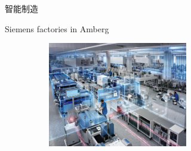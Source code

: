 \begin{frame}{智能制造}
	\begin{exampleblock}{\textrm{Siemens factories in Amberg}}

\begin{figure}[h!]
\centering
     \includegraphics[height=1.8in, width=3.1in, viewport=0 0 2650 1992,clip]{Figures/Siemens_Amberg-Factory.jpeg}
\label{Fig:Siemens_Amberg-Factory}
\end{figure}
  \end{exampleblock}
\fontsize{8.2pt}{6.2pt}
\end{frame}

